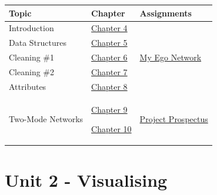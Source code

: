 \documentclass[
  letterpaper,
  DIV=11,
  numbers=noendperiod]{scrreprt}
\begin{document}
\begin{longtable}[]{@{}
  >{\centering\arraybackslash}p{}
  >{\centering\arraybackslash}p{}
  >{\centering\arraybackslash}p{}@{}}
\toprule\noalign{}
\begin{minipage}[b]{\linewidth}\centering
Topic
\end{minipage} & \begin{minipage}[b]{\linewidth}\centering
Chapter
\end{minipage} & \begin{minipage}[b]{\linewidth}\centering
Assignments
\end{minipage} \\
\midrule\noalign{}
\endhead
\bottomrule\noalign{}
\endlastfoot
Introduction & \href{Unit\%201.qmd}{Chapter 4} & \\
Data Structures & \href{Network\%20Data\%20Structures.qmd}{Chapter 5}
& \\
Cleaning \#1 &
\href{Cleaning\%20Network\%20Data\%20-\%20Trimming\%20and\%20Adding.qmd}{Chapter
6} & \href{A1_My\%20Ego\%20Network.qmd}{My Ego Network} \\
Cleaning \#2 &
\href{Cleaning\%20Network\%20Data\%20-\%20Subgraphs.qmd}{Chapter 7} & \\
Attributes & \href{Node\%20and\%20Edge\%20Attributes.qmd}{Chapter 8}
& \\
Two-Mode Networks &
\href{Two\%20Mode\%20Networks\%20-\%20AM.qmd}{Chapter 9}

\href{Two\%20Mode\%20Networks\%20-\%20Edgelists.qmd}{Chapter 10} &
\href{A2_Project\%20Prospectus.qmd}{Project Prospectus} \\
\end{longtable}

\section{Unit 2 - Visualising}\label{unit-2---visualising}
\end{document}
